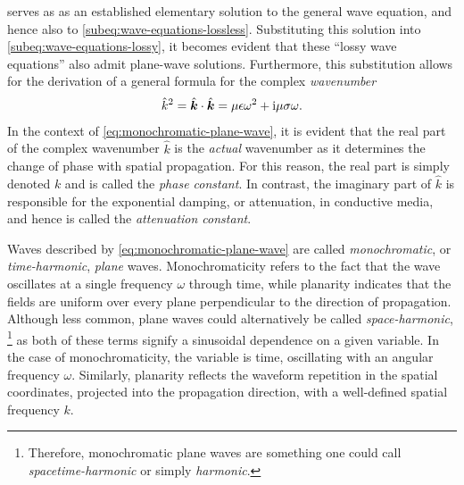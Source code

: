 \documentclass[11pt,a4paper,twoside,openany]{report}
\begin{document}
 serves as as an established elementary solution to the general wave equation, and hence also to \cref{subeq:wave-equations-lossless}. Substituting this solution into \cref{subeq:wave-equations-lossy}, it becomes evident that these \enquote{lossy wave equations} also admit plane-wave solutions. Furthermore, this substitution allows for the derivation of a general formula for the complex \emph{wavenumber}
\begin{align}
    \label{eq:wave-number}
    \hat k^2 = \hat{\boldsymbol k} \cdot \hat{\boldsymbol k} = \mu\epsilon\omega^2 + \mathrm i\mu\sigma\omega.
\end{align}
In the context of \cref{eq:monochromatic-plane-wave}, it is evident that the real part of the complex wavenumber $\hat k$ is the \emph{actual} wavenumber as it determines the change of phase with spatial propagation. For this reason, the real part is simply denoted $k$ and is called the \emph{phase constant}. In contrast, the imaginary part of $\hat k$ is responsible for the exponential damping, or attenuation, in conductive media, and hence is called the \emph{attenuation constant}.

Waves described by \cref{eq:monochromatic-plane-wave} are called \emph{monochromatic}, or \emph{time-harmonic}, \emph{plane}
waves. Monochromaticity refers to the fact that the wave oscillates at a single frequency $\omega$ through time, while planarity indicates that the fields are uniform over every plane perpendicular to the direction of propagation. Although less common, plane waves could alternatively be called \emph{space-harmonic},%
    \footnote{Therefore, monochromatic plane waves are something one could call \emph{spacetime-harmonic} or simply \emph{harmonic}.}
as both of these terms signify a sinusoidal dependence on a given variable. In the case of monochromaticity, the variable is time, oscillating with an angular frequency $\omega$. Similarly, planarity reflects the waveform repetition in the spatial coordinates, projected into the propagation direction, with a well-defined spatial frequency $k$.
\end{document}
